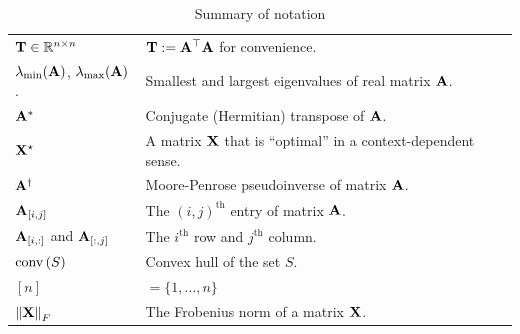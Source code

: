 \documentclass{article}
\begin{document}
\begin{table}[H]
\begin{tabular}{ll}
$\mathbf{T} \in \mathbb{R}^{n \times n}$  & $\mathbf{T} := \mathbf{A}^\top\mathbf{A}$ for convenience. \\
$\lambda_{\min}(\mathbf{A})$, $\lambda_{\max}(\mathbf{A})$. & Smallest and largest eigenvalues of real matrix $\mathbf{A}$. \\
$\mathbf{A}^*$  & Conjugate (Hermitian) transpose of $\mathbf{A}$. \\
$\mathbf{X}^\star$  & A matrix $\mathbf{X}$ that is ``optimal'' in a context-dependent sense. \\
$\mathbf{A}^\dagger$  & Moore-Penrose pseudoinverse of matrix $\mathbf{A}$. \\
$\mathbf{A}_{[i, j]}$ & The $(i, j)^{\text{th}}$ entry of matrix $\mathbf{A}$. \\
$\mathbf{A}_{[i, :]}$ and $\mathbf{A}_{[:, j]}$  & The $i^{\text{th}}$ row and $j^{\text{th}}$ column. \\
$\operatorname{conv}\left(S\right)$ & Convex hull of the set $S$.\\
$[n]$ & $=\{1, \dots, n\}$ \\
$\left\|\mathbf{X}\right\|_F$  & The Frobenius norm of a matrix $\mathbf{X}$. \\
\bottomrule
\end{tabular}
\caption{Summary of notation}\label{tab:notation}
\end{table}
\end{document}
